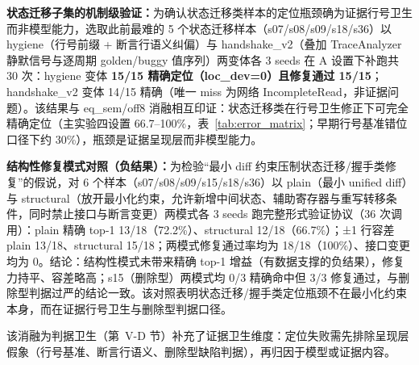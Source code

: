 \textbf{状态迁移子集的机制级验证：}为确认状态迁移类样本的定位瓶颈确为证据行号卫生而非模型能力，选取此前最难的 5 个状态迁移样本（s07/s08/s09/s18/s36）以 hygiene（行号前缀 + 断言行语义纠偏）与 handshake\_v2（叠加 TraceAnalyzer 静默信号与逐周期 golden/buggy 值序列）两变体各 3 seeds 在 A 设置下补跑共 30 次：hygiene 变体 \textbf{15/15 精确定位（loc\_dev=0）且修复通过 15/15}；handshake\_v2 变体 14/15 精确（唯一 miss 为网络 IncompleteRead，非证据问题）。该结果与 eq\_sem/off8 消融相互印证：状态迁移类在行号卫生修正下可完全精确定位（主实验四设置 66.7--100\%，表~\ref{tab:error_matrix}；早期行号基准错位口径下约 30\%），瓶颈是证据呈现层而非模型能力。

\textbf{结构性修复模式对照（负结果）：}为检验“最小 diff 约束压制状态迁移/握手类修复”的假说，对 6 个样本（s07/s08/s09/s15/s18/s36）以 plain（最小 unified diff）与 structural（放开最小化约束，允许新增中间状态、辅助寄存器与重写转移条件，同时禁止接口与断言变更）两模式各 3 seeds 跑完整形式验证协议（36 次调用）：plain 精确 top-1 13/18（72.2\%）、structural 12/18（66.7\%）；±1 行容差 plain 13/18、structural 15/18；两模式修复通过率均为 18/18（100\%）、接口变更均为 0。结论：结构性模式未带来精确 top-1 增益（有数据支撑的负结果），修复力持平、容差略高；s15（删除型）两模式均 0/3 精确命中但 3/3 修复通过，与删除型判据过严的结论一致。该对照表明状态迁移/握手类定位瓶颈不在最小化约束本身，而在证据行号卫生与删除型判据口径。

该消融为判据卫生（第~V-D 节）补充了证据卫生维度：定位失败需先排除呈现层假象（行号基准、断言行语义、删除型缺陷判据），再归因于模型或证据内容。
